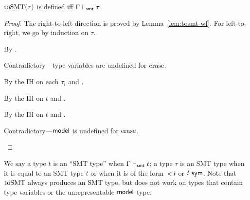 \documentclass[acmsmall,screen,nonacm]{acmart}
\theoremstyle{definition}
\begin{document}
\begin{lemma}
  \label{lem:tosmt-defined}
%  
  $\mathrm{toSMT}(\tau)$ is defined iff $\Gamma \vdash_{\mathsf{smt}} \tau$.
%
  \begin{proof}
    The right-to-left direction is proved by Lemma~\ref{lem:tosmt-wf}.
%
    For left-to-right, we go by induction on $\tau$.
%
    \begin{proofcases}
    \item[($\tau=B$)] By .
      
    \item[($\tau=\alpha$)] Contradictory---type variables are undefined for $\mathrm{erase}$.
      
    \item[($\tau=D ~ \vec{\tau_i}$)] By the IH on each $\tau_i$ and .
      
    \item[($\tau=\smt{t}$)] By the IH on $t$ and .
      
    \item[($\tau=\sym{t}$)] By the IH on $t$ and .
      
    \item[($\tau=\MODEL$)] Contradictory---$\mathsf{model}$ is undefined for $\mathrm{erase}$.
%
    \qedhere
    \end{proofcases}    
  \end{proof}  
\end{lemma}


We say a type $t$ is an ``SMT type'' when $\Gamma \vdash_{\mathsf{smt}} t$; a
type $\tau$ is an SMT type when it is equal to an SMT type $t$ or when
it is of the form $\smt{t}$ or ${t} ~ \mathsf{sym}$. Note that $\mathrm{toSMT}$ always
produces an SMT type, but does not work on types that contain type
variables or the unrepresentable $\mathsf{model}$ type.
\end{document}
